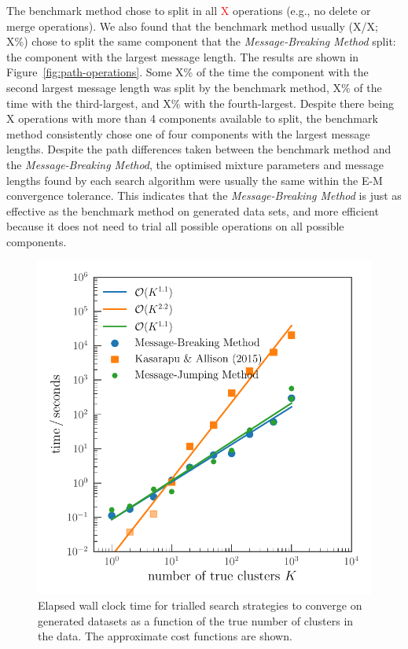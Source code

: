 \documentclass{elsarticle}
\newcommand{\todo}[1]{\textcolor{red}{#1}}
\begin{document}
The benchmark method chose to split in all \todo{X} operations (e.g., no delete or merge operations). We also found that the benchmark method usually (X/X; X\%) chose to split the same component that the \emph{Message-Breaking Method} split: the component with the largest message length. The results are shown in Figure~\ref{fig:path-operations}. Some X\% of the time the component with the second largest message length was split by the benchmark method, X\% of the time with the third-largest, and X\% with the fourth-largest. Despite there being X operations with more than 4 components available to split, the benchmark method consistently chose one of four components with the  largest message lengths. Despite the path differences taken between the benchmark method and the \emph{Message-Breaking Method}, the optimised mixture parameters and message lengths found by each search algorithm were usually the same within the E-M convergence tolerance. This indicates that the \emph{Message-Breaking Method} is just as effective as the benchmark method on generated data sets, and more efficient because it does not need to trial all possible operations on all possible components.








\begin{figure}
    \includegraphics[width=1.0\textwidth]{cost.pdf}
    \caption{Elapsed wall clock time for trialled search strategies to converge 
             on generated datasets as a function of the true number of clusters
             in the data. The approximate cost functions are shown.}
    \label{fig:cost}
\end{figure}
\end{document}
